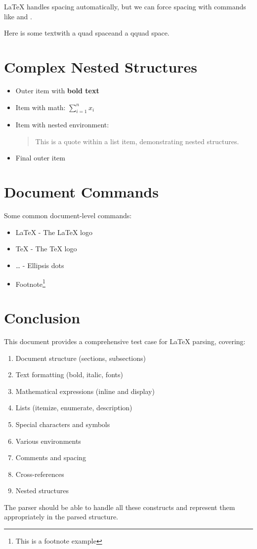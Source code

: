 \documentclass[12pt,a4paper]{article}
\begin{document}
LaTeX handles spacing automatically, but we can force spacing with commands like \quad and \qquad.

Here is some text\quad with a quad space\qquad and a qquad space.

\section{Complex Nested Structures}

\begin{itemize}
    \item Outer item with \textbf{bold text}
    \item Item with math: $\sum_{i=1}^{n} x_i$
    \item Item with nested environment:
    \begin{quote}
        This is a quote within a list item, demonstrating nested structures.
    \end{quote}
    \item Final outer item
\end{itemize}

\section{Document Commands}

Some common document-level commands:
\begin{itemize}
    \item \LaTeX{} - The LaTeX logo
    \item \TeX{} - The TeX logo  
    \item \ldots{} - Ellipsis dots
    \item Footnote\footnote{This is a footnote example}
\end{itemize}

\section{Conclusion}

This document provides a comprehensive test case for LaTeX parsing, covering:
\begin{enumerate}
    \item Document structure (sections, subsections)
    \item Text formatting (bold, italic, fonts)
    \item Mathematical expressions (inline and display)
    \item Lists (itemize, enumerate, description)
    \item Special characters and symbols
    \item Various environments
    \item Comments and spacing
    \item Cross-references
    \item Nested structures
\end{enumerate}

The parser should be able to handle all these constructs and represent them appropriately in the parsed structure.
\end{document}
